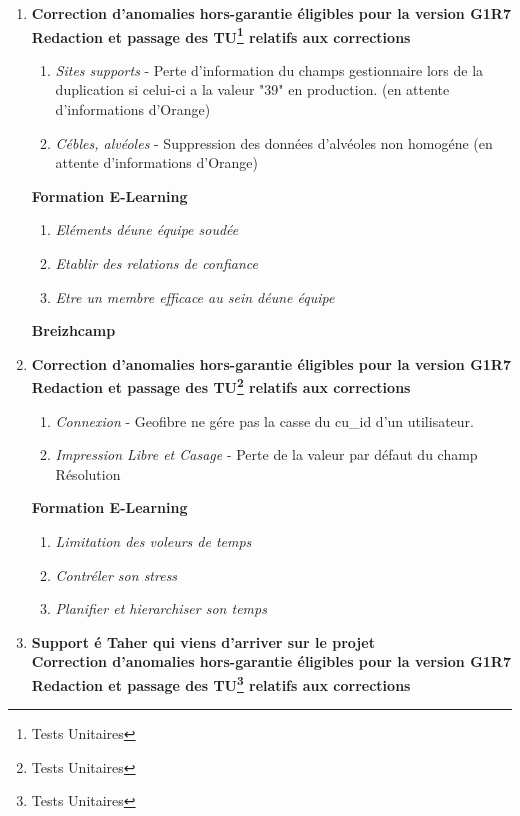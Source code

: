 \begin{enumerate}[label= Semaine \no\textbf{\arabic*.},itemsep=20pt]
\item
\textbf{Correction d'anomalies hors-garantie éligibles pour la version G1R7}
\textbf{Redaction et passage des \textsc{TU\footnote{Tests Unitaires}} relatifs aux corrections}
\begin{enumerate}[label = Correction \no\arabic*.,align=left]
	\item \textit{Sites supports} - Perte d'information du champs gestionnaire lors de la duplication si celui-ci a la valeur "39" en production. (en attente d'informations d'Orange)
	\item \textit{Cébles, alvéoles} -  Suppression des données d'alvéoles non homogéne (en attente d'informations d'Orange)
\end{enumerate}
\textbf{Formation E-Learning}
\begin{enumerate}[label = Formation \no\arabic*.,align=left]
	\item \textit{Eléments déune équipe soudée}
	\item \textit{Etablir des relations de confiance}
	\item \textit{Etre un membre efficace au sein déune équipe}
\end{enumerate}
\textbf{Breizhcamp}
\item
\textbf{Correction d'anomalies hors-garantie éligibles pour la version G1R7}
\textbf{Redaction et passage des \textsc{TU\footnote{Tests Unitaires}} relatifs aux corrections}
\begin{enumerate}[label = Correction \no\arabic*.,align=left]
	\item \textit{Connexion} -  Geofibre ne gére pas la casse du cu\_id d'un utilisateur.
	\item \textit{Impression Libre et Casage} - Perte de la valeur par défaut du champ Résolution
\end{enumerate}
\textbf{Formation E-Learning}
\begin{enumerate}[label = Formation \no\arabic*.,align=left]
	\item \textit{Limitation des voleurs de temps}
	\item \textit{Contréler son stress}
	\item \textit{Planifier et hierarchiser son temps}
\end{enumerate}
\item
\textbf{Support é Taher qui viens d'arriver sur le projet}\\
\textbf{Correction d'anomalies hors-garantie éligibles pour la version G1R7}\\
\textbf{Redaction et passage des \textsc{TU\footnote{Tests Unitaires}} relatifs aux corrections}\\

\end{enumerate}

